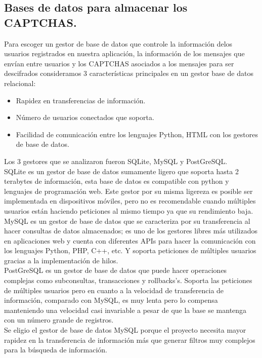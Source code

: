 \documentclass[12pt,oneside,onecolumn,openany]{report}
\begin{document}
\subsection{Bases de datos para almacenar los CAPTCHAS.}
Para escoger un gestor de base de datos que controle la información delos usuarios registrados en nuestra aplicación, la información de los  mensajes que envían entre usuarios y los CAPTCHAS asociados a los mensajes para ser descifrados consideramos 3 características principales en un gestor base de datos relacional:\\
\begin{itemize}
 \item Rapidez en transferencias de información.
 \item Número de usuarios conectados que soporta.
 \item Facilidad de comunicación entre los lenguajes Python, HTML con los gestores de base de datos.
\end{itemize}
Los 3 gestores que se analizaron fueron SQLite, MySQL y PostGreSQL.\\
SQLite es un gestor de base de datos sumamente ligero que soporta hasta 2 terabytes de información, esta base de datos es compatible con python y lenguajes de programación web. Este gestor por su misma ligereza es posible ser implementada en dispositivos móviles, pero no es recomendable cuando múltiples usuarios están haciendo peticiones al mismo tiempo ya que su rendimiento baja\cite{DB}.\\
MySQL es un gestor de base de datos que se caracteriza por su transferencia al hacer consultas de datos almacenados; es uno de los gestores libres más utilizados en aplicaciones web y cuenta con diferentes APIs para hacer la comunicación con los lenguajes Python, PHP, C++, etc. Y soporta peticiones de múltiples usuarios gracias a la implementación de hilos.\\
PostGreSQL es un gestor de base de datos que puede hacer operaciones complejas como subconsultas, transacciones y rollbacks’s. Soporta las peticiones de múltiples usuarios pero en cuanto a la velocidad de transferencia de información, comparado con MySQL, es muy lenta pero lo compensa manteniendo una velocidad casi invariable a pesar de que la base se mantenga con un número grande de registros.\cite{sql}\\
Se eligio el gestor de base de datos MySQL porque el proyecto necesita mayor rapidez en la transferencia de información más que generar filtros muy complejos para la búsqueda de información.\\
\clearpage
\end{document}
